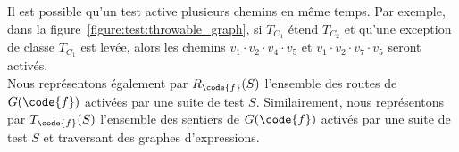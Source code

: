 Il est possible qu'un test active plusieurs chemins en même temps. Par exemple,
dans la figure~\ref{figure:test:throwable_graph}, si $T_{C_1}$ étend $T_{C_2}$
et qu'une exception de classe $T_{C_1}$ est levée, alors les chemins $v_1 \cdot
v_2 \cdot v_4 \cdot v_5$ et $v_1 \cdot v_2 \cdot v_7 \cdot v_5$ seront activés.
\\

Nous représentons également par $R_\code{f}(S)$ l'ensemble des routes de
$G(\code{f})$ activées par une suite de test $S$. Similairement, nous
représentons par $T_\code{f}(S)$ l'ensemble des sentiers de $G(\code{f})$
activés par une suite de test $S$ et traversant des graphes d'expressions.
